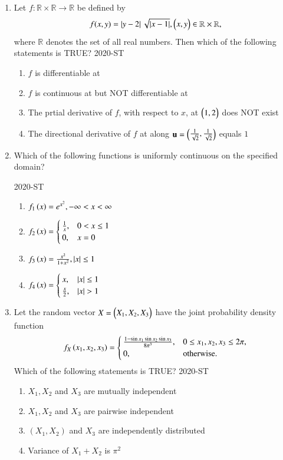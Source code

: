 \documentclass[journal]{IEEEtran}
\begin{document}
\begin{enumerate}
\item Let $f : \mathbb{R} \times \mathbb{R} \to \mathbb{R}$ be defined by
\begin{align*}
 f(x, y) = \left\vert y - 2\right\vert \sqrt{\left\vert x - 1\right\vert}, \begin{pmatrix}x, y\end{pmatrix} \in \mathbb{R} \times \mathbb{R},   
\end{align*}
where  $\mathbb{R}$ denotes the set of all real numbers. Then which of the following statements is TRUE?
\hfill{2020-ST}
\begin{enumerate}
    \item $f$ is differentiable at 
    \item $f$ is continuous at  but NOT differentiable at 
    \item The prtial derivative of  $f$, with respect to  $x$, at $\begin{pmatrix}1,2\end{pmatrix}$ does NOT exist
    \item The directional derivative of  $f$ at  along  $\mathbf{u} = \begin{pmatrix}\frac{1}{\sqrt{2}}, \frac{1}{\sqrt{2}}\end{pmatrix}$ equals $1$
\end{enumerate}

\item Which of the following functions is uniformly continuous on the 
specified domain? 

\hfill{2020-ST}

\begin{enumerate}
    \item $f_1\left(x\right) = e^{x^2}, -\infty < x < \infty$
    \item $f_2\left(x\right) = \begin{cases} \frac{1}{x}, & 0 < x \leq 1 \\ 0, & x = 0 \end{cases}$
    \item $f_3\left(x\right) = \frac{x^2}{1 + x^2}, \left\vert x\right\vert \leq 1$
    \item $f_4\left(x\right) = \begin{cases} x, & \left\vert x\right\vert \leq 1 \\ \frac{x}{2}, & \left\vert x\right\vert > 1 \end{cases}$
\end{enumerate}
\item Let the random vector $X = \begin{pmatrix}X_1, X_2, X_3\end{pmatrix}$ have the joint probability density function
\begin{align*}
f_X\left(x_1, x_2, x_3\right) = \begin{cases}
\frac{1 - \sin x_1 \sin x_2 \sin x_3}{8 \pi^3}, & 0 \leq x_1, x_2, x_3 \leq 2 \pi, \\
0, & \text{otherwise}.
\end{cases}
\end{align*}
Which of the following statements is TRUE?
\hfill{2020-ST}
\begin{enumerate}
    \item $X_1, X_2$ and $X_3$ are mutually independent
    \item $X_1, X_2$ and $X_3$ are pairwise independent
    \item $(X_1, X_2)$ and $X_3$ are independently distributed
    \item Variance of $X_1 + X_2$ is $\pi^2$
\end{enumerate}


\end{enumerate}
\end{document}

